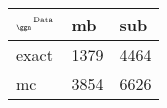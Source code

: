 \begin{tabular}{lll}
    \toprule
    $_{\text{\tiny{\ggn}}}$$^{\text{\tiny{Data}}}$ & mb & sub \\
    \midrule
    exact & 1379
              & 4464 \\
    mc   & 3854
              & 6626 \\
    \bottomrule
\end{tabular}